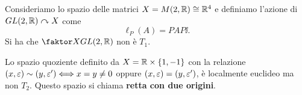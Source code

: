 \begin{multicols*}{2}
\begin{example}\label{Matrici2x2QuozienteSimilitudine}
Consideriamo lo spazio delle matrici $X=M(2,\mathbb{R})\cong \mathbb{R}^4$ e definiamo l'azione di $GL(2,\mathbb{R})\curvearrowright X$ come
\[\ell_P(A)=PAP\ii.\]
Si ha che $\quot X{GL(2,\R)}$ non \`e $T_1$.
\end{example}

\begin{example}\label{LocalmenteEuclideoNonT2}
Lo spazio quoziente definito da $X=\mathbb{R}\times \{1,-1\}$ con la relazione $(x,\varepsilon)\sim(y,\varepsilon')\Longleftrightarrow x=y\neq0$ oppure $(x,\varepsilon)=(y,\varepsilon')$, \`e localmente euclideo ma non $T_2$. Questo spazio si chiama \textbf{retta con due origini}.
\end{example}


\end{multicols*}
